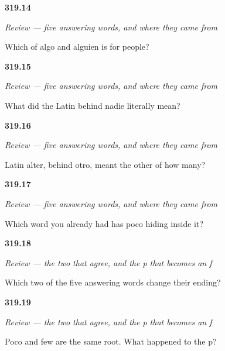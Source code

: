 \noindent\begin{minipage}[t]{\linewidth}
\raggedright
\hypertarget{review-ES-C319-repaso-respuestas-pair}{\textbf{319.14}} \emph{Review — five answering words, and where they came from}\par
\small Which of algo and alguien is for people?
\end{minipage}\par\medskip

\noindent\begin{minipage}[t]{\linewidth}
\raggedright
\hypertarget{review-ES-C319-repaso-respuestas-born}{\textbf{319.15}} \emph{Review — five answering words, and where they came from}\par
\small What did the Latin behind nadie literally mean?
\end{minipage}\par\medskip

\noindent\begin{minipage}[t]{\linewidth}
\raggedright
\hypertarget{review-ES-C319-repaso-respuestas-two}{\textbf{319.16}} \emph{Review — five answering words, and where they came from}\par
\small Latin alter, behind otro, meant the other of how many?
\end{minipage}\par\medskip

\noindent\begin{minipage}[t]{\linewidth}
\raggedright
\hypertarget{review-ES-C319-repaso-respuestas-few}{\textbf{319.17}} \emph{Review — five answering words, and where they came from}\par
\small Which word you already had has poco hiding inside it?
\end{minipage}\par\medskip

\noindent\begin{minipage}[t]{\linewidth}
\raggedright
\hypertarget{review-ES-C319-otro-y-poco-agree}{\textbf{319.18}} \emph{Review — the two that agree, and the p that becomes an f}\par
\small Which two of the five answering words change their ending?
\end{minipage}\par\medskip

\noindent\begin{minipage}[t]{\linewidth}
\raggedright
\hypertarget{review-ES-C319-otro-y-poco-shift}{\textbf{319.19}} \emph{Review — the two that agree, and the p that becomes an f}\par
\small Poco and few are the same root. What happened to the p?
\end{minipage}\par\medskip

